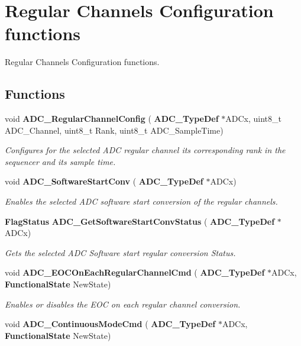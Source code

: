 \section{Regular Channels Configuration functions}
\label{group__ADC__Group4}


Regular Channels Configuration functions.  


\subsection*{Functions}
\begin{DoxyCompactItemize}
\item 
void \textbf{ A\+D\+C\+\_\+\+Regular\+Channel\+Config} (\textbf{ A\+D\+C\+\_\+\+Type\+Def} $\ast$A\+D\+Cx, uint8\+\_\+t A\+D\+C\+\_\+\+Channel, uint8\+\_\+t Rank, uint8\+\_\+t A\+D\+C\+\_\+\+Sample\+Time)
\begin{DoxyCompactList}\small\item\em Configures for the selected A\+DC regular channel its corresponding rank in the sequencer and its sample time. \end{DoxyCompactList}\item 
void \textbf{ A\+D\+C\+\_\+\+Software\+Start\+Conv} (\textbf{ A\+D\+C\+\_\+\+Type\+Def} $\ast$A\+D\+Cx)
\begin{DoxyCompactList}\small\item\em Enables the selected A\+DC software start conversion of the regular channels. \end{DoxyCompactList}\item 
\textbf{ Flag\+Status} \textbf{ A\+D\+C\+\_\+\+Get\+Software\+Start\+Conv\+Status} (\textbf{ A\+D\+C\+\_\+\+Type\+Def} $\ast$A\+D\+Cx)
\begin{DoxyCompactList}\small\item\em Gets the selected A\+DC Software start regular conversion Status. \end{DoxyCompactList}\item 
void \textbf{ A\+D\+C\+\_\+\+E\+O\+C\+On\+Each\+Regular\+Channel\+Cmd} (\textbf{ A\+D\+C\+\_\+\+Type\+Def} $\ast$A\+D\+Cx, \textbf{ Functional\+State} New\+State)
\begin{DoxyCompactList}\small\item\em Enables or disables the E\+OC on each regular channel conversion. \end{DoxyCompactList}\item 
void \textbf{ A\+D\+C\+\_\+\+Continuous\+Mode\+Cmd} (\textbf{ A\+D\+C\+\_\+\+Type\+Def} $\ast$A\+D\+Cx, \textbf{ Functional\+State} New\+State)

\end{DoxyCompactItemize}
